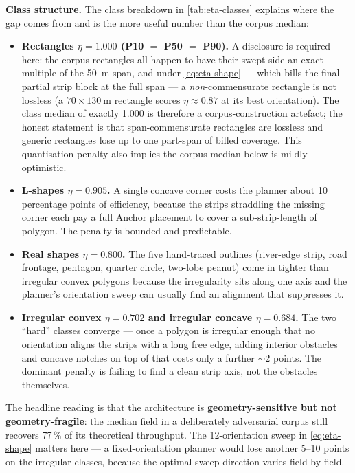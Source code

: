 \documentclass[11pt,a4paper]{article}
\begin{document}
\textbf{Class structure.} The class breakdown in \cref{tab:eta-classes} explains where the gap comes from and is the more useful number than the corpus median:
\begin{itemize}[leftmargin=1.6em,itemsep=0.15em]
    \item \textbf{Rectangles $\eta = 1.000$ (P10 $=$ P50 $=$ P90).} A disclosure is required here: the corpus rectangles all happen to have their swept side an exact multiple of the \SI{50}{\meter} span, and under \cref{eq:eta-shape} --- which bills the final partial strip block at the full span --- a \emph{non}-commensurate rectangle is not lossless (a $70\times\SI{130}{\meter}$ rectangle scores $\eta \approx 0.87$ at its best orientation). The class median of exactly 1.000 is therefore a corpus-construction artefact; the honest statement is that span-commensurate rectangles are lossless and generic rectangles lose up to one part-span of billed coverage. This quantisation penalty also implies the corpus median below is mildly optimistic.
    \item \textbf{L-shapes $\eta = 0.905$.} A single concave corner costs the planner about 10 percentage points of efficiency, because the strips straddling the missing corner each pay a full Anchor placement to cover a sub-strip-length of polygon. The penalty is bounded and predictable.
    \item \textbf{Real shapes $\eta = 0.800$.} The five hand-traced outlines (river-edge strip, road frontage, pentagon, quarter circle, two-lobe peanut) come in tighter than irregular convex polygons because the irregularity sits along one axis and the planner's orientation sweep can usually find an alignment that suppresses it.
    \item \textbf{Irregular convex $\eta = 0.702$ and irregular concave $\eta = 0.684$.} The two ``hard'' classes converge --- once a polygon is irregular enough that no orientation aligns the strips with a long free edge, adding interior obstacles and concave notches on top of that costs only a further $\sim$2 points. The dominant penalty is failing to find a clean strip axis, not the obstacles themselves.
\end{itemize}
The headline reading is that the architecture is \textbf{geometry-sensitive but not geometry-fragile}: the median field in a deliberately adversarial corpus still recovers 77\,\% of its theoretical throughput. The 12-orientation sweep in \cref{eq:eta-shape} matters here --- a fixed-orientation planner would lose another 5--10 points on the irregular classes, because the optimal sweep direction varies field by field.
\end{document}
